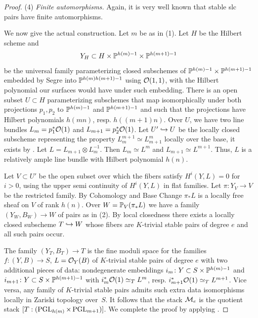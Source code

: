 \documentclass[table,x11names]{amsart}
\begin{document}
\begin{proof}
  (4) \emph{Finite automorphisms.} Again, it is very well known that
  stable slc pairs have finite automorphisms.

  \medskip

  We now give the actual construction. Let $m$ be as in (1). Let
  $H$ be the Hilbert scheme and 
  $$Y_H \subset H \times {\mathbb P}^{h(m)-1} \times {\mathbb P}^{h(m+1)-1}$$ be the
  universal family parameterizing closed
  subschemes of ${\mathbb P}^{h(m)-1} \times {\mathbb P}^{h(m+1)-1}$ embedded by Segre
  into ${\mathbb P}^{h(m)h(m+1)-1}$ using ${\mathcal O}(1,1)$, with the Hilbert
  polynomial our surfaces would have under such embedding. There is an
  open subset $U\subset H$ parameterizing subschemes that map
  isomorphically under both projections $p_1,p_2$ to ${\mathbb P}^{h(m)-1}$
  and ${\mathbb P}^{h(m+1)-1}$ and such that the projections have Hilbert
  polynomials $h(mn)$, resp. $h((m+1)n)$.  Over $U$, we have two line
  bundles $L_m=p_1^*{\mathcal O}(1)$ and $L_{m+1}=p_2^*{\mathcal O}(1)$. Let
  $U'\hookrightarrow U$ be the locally closed subscheme representing the
  property 
  $L_m^{m+1} \simeq L_{m+1}^m$ locally over the base, it exists by
  \cite[Lem.\ 1.19]{viehweg1995quasi-projective-moduli}.
  Let $L = L_{m+1}\otimes L_m^{-1}$. Then $L_m \simeq L^m$
  and $L_{m+1} \simeq L^{m+1}$. Thus, $L$ is a relatively ample
  line bundle with Hilbert polynomial $h(n)$. 
  
  Let $V\subset U'$ be the open subset over which the fibers satisfy
  $H^i(Y,L)=0$ for $i>0$, using the upper semi continuity of
  $H^i(Y,L)$ in flat families.  Let $\pi\colon Y_V \to V$ be the
  restricted family. By Cohomology and Base Change $\pi_*L$ is a
  locally free sheaf on $V$ of rank $h(n)$. Over $W={\mathbb P}_V(\pi_*L)$
  we have a family $(Y_W,B_W)\to W$ of pairs as in (2). By local
  closedness there exists a locally closed subscheme $T\hookrightarrow W$ whose
  fibers are $K$-trivial stable pairs of degree $e$ and all such pairs
  occur.

  The family $(Y_T, B_T) \to T$ is the fine moduli space for the
  families $f\colon (Y,B)\to S$, $L={\mathcal O}_Y(B)$ of $K$-trivial
  stable pairs of degree $e$ with two additional pieces of data:
  nondegenerate embeddings $i_m\colon Y \subset S\times {\mathbb P}^{h(m)-1}$
  and $i_{m+1}\colon Y \subset S\times {\mathbb P}^{h(m+1)-1}$ with
  $i_m^*{\mathcal O}(1)\simeq_T L^m$, resp.
  $i_{m+1}^*{\mathcal O}(1)\simeq_T L^{m+1}$.  Vice versa, any family of
  $K$-trivial stable pairs admits such extra data isomorphisms locally
  in Zariski topology over~$S$. It follows that the stack ${\mathcal M}_e$ is
  the quotient stack $[T: (\operatorname{PGL}_{h(m)}\times\operatorname{PGL}_{m+1})]$.  We
  complete the proof by applying \cite[1.1,
  1.3]{keel1997quotients-by-groupoids}.
\end{proof}
\end{document}
